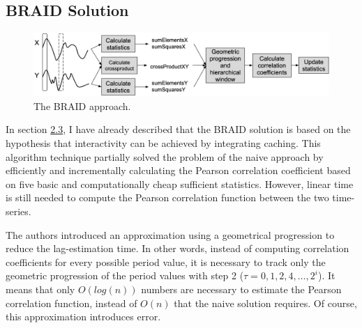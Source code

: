 \subsection{BRAID Solution~\cite{ref6}}
\begin{figure}[hb]
\centering
    \label{fig:BRAID}
    \includegraphics[width=\textwidth]{figures/braid.png}
    \caption{The BRAID approach.}
\end{figure}
In section \hyperref[sec:iBRAID]{2.3}, I have already described that the BRAID solution is based on the hypothesis that interactivity can be achieved by integrating caching. This algorithm technique partially solved the problem of the naive approach by efficiently and incrementally calculating the Pearson correlation coefficient based on five basic and computationally cheap sufficient statistics. However, linear time is still needed to compute the Pearson correlation function between the two time-series. \newline

The authors introduced an approximation using a geometrical progression to reduce the lag-estimation time. In other words, instead of computing correlation coefficients for every possible period value, it is necessary to track only the geometric progression of the period values with step 2 ($\tau = 0,1,2,4, \ldots, 2^{i}$). It means that only $O(log(n))$ numbers are necessary to estimate the Pearson correlation function, instead of $O(n)$ that the naive solution requires. Of course, this approximation introduces error. \newline

